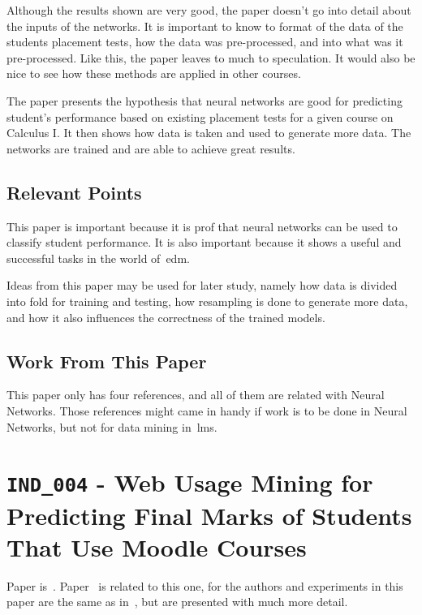Although the results shown are very good, the paper doesn't go into detail
about the inputs of the networks. It is important to know to format of the data
of the students placement tests, how the data was pre-processed, and into what
was it pre-processed. Like this, the paper leaves to much to speculation. It
would also be nice to see how these methods are applied in other courses.

The paper presents the hypothesis that neural networks are good for predicting
student's performance based on existing placement tests for a given course on
Calculus I. It then shows how data is taken and used to generate more data. The
networks are trained and are able to achieve great results.

\subsection{Relevant Points}

This paper is important because it is prof that neural networks can be used to
classify student performance. It is also important because it shows a useful
and successful tasks in the world of~\gls{edm}.

Ideas from this paper may be used for later study, namely how data is divided
into fold for training and testing, how resampling is done to generate more
data, and how it also influences the correctness of the trained models.

\subsection{Work From This Paper}

This paper only has four references, and all of them are related with Neural
Networks. Those references might came in handy if work is to be done in Neural
Networks, but not for data mining in~\gls{lms}.

\section{\texttt{IND\_004} - Web Usage Mining for Predicting Final Marks of
Students That Use Moodle Courses}

Paper is~\cite{ind_004}. Paper~\cite{ind_001} is related to this one, for the
authors and experiments in this paper are the same as in~\cite{ind_001}, but
are presented with much more detail.

